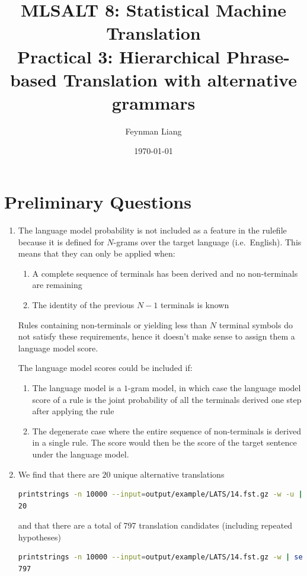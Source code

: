 \documentclass[a4paper,oneside,reqno]{amsart}
\newcommand{\authorname}{Feynman Liang}
\newcommand{\coursename}{MLSALT 8: Statistical Machine Translation}
\newcommand{\assignmentname}{Practical 3: Hierarchical Phrase-based Translation
with alternative grammars}
\begin{document}
\title{\coursename\\\assignmentname}

\author{\authorname}
\date{\today}

\maketitle

\section{Preliminary Questions}
\begin{enumerate}[label=\arabic*.]
  \item The language model probability is not included as a feature in the
    rulefile because it is defined for $N$-grams over the target language
    (i.e.\ English). This means that they can only be applied when:
    \begin{enumerate}
      \item A complete sequence of terminals has been derived and no
        non-terminals are remaining
      \item The identity of the previous $N-1$ terminals is known
    \end{enumerate}
    Rules containing non-terminals or yielding less than $N$ terminal symbols
    do not satisfy these requirements, hence it doesn't make sense to assign
    them a language model score.

    The language model scores could be included if:
    \begin{enumerate}
      \item The language model is a $1$-gram model, in which case the language
        model score of a rule is the joint probability of all the terminals
        derived one step after applying the rule
      \item The degenerate case where the entire sequence of non-terminals is
        derived in a single rule. The score would then be the score of the
        target sentence under the language model.
    \end{enumerate}

  \item We find that there are $20$ unique alternative translations
    \begin{lstlisting}[language=bash]
printstrings -n 10000 --input=output/example/LATS/14.fst.gz -w -u | sed '/[EMPTY]/d' | wc -l
20
    \end{lstlisting}
    and that there are a total of 797 translation candidates (including repeated hypotheses)
    \begin{lstlisting}[language=bash]
printstrings -n 10000 --input=output/example/LATS/14.fst.gz -w | sed '/[EMPTY]/d' | wc -l
797
    \end{lstlisting}


\end{enumerate}
\end{document}
